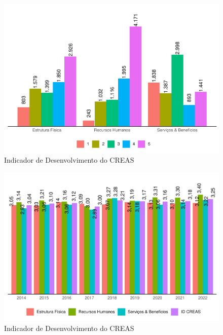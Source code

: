 \documentclass[
  brazilian]{report}
\begin{document}
\begin{figure}
\includegraphics{Censo-SUAS-2022_files/figure-latex/idcras_fis-1} \caption[Indicador de Desenvolvimento do CREAS]{Indicador de Desenvolvimento do CREAS}\label{fig:idcras_fis}
\end{figure}

\begin{figure}
\includegraphics{Censo-SUAS-2022_files/figure-latex/idcreas-1} \caption[Indicador de Desenvolvimento do CREAS]{Indicador de Desenvolvimento do CREAS}\label{fig:idcreas}
\end{figure}
\end{document}
